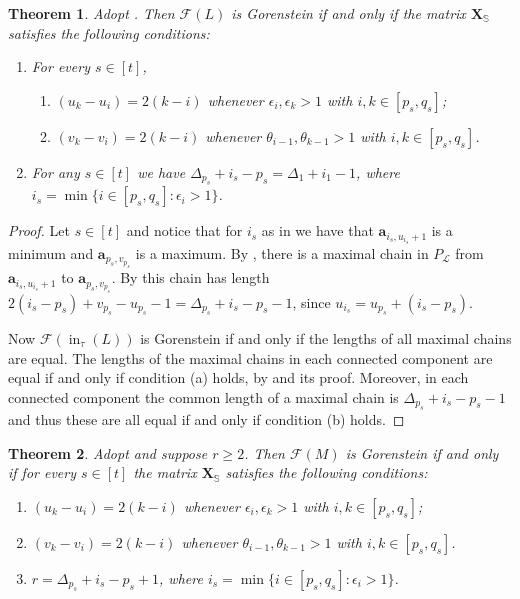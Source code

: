 \documentclass[11pt,a4paper,reqno,dvipsnames]{amsart}
\theoremstyle{plain}
\newtheorem{Theorem}{Theorem}[section]
\theoremstyle{definition}
\newtheorem{Assumptions and Discussion}[Theorem]{Assumptions and Discussion}
\theoremstyle{remark}
\def\ini{\operatorname{in}}
\newcommand\bda{{\bm a}}
\newcommand\bfX{\mathbf{X}}
\newcommand\bfS{\mathbb{S}}
\newcommand\calF{\mathcal{F}}
\newcommand\calL{\mathcal{L}}
\begin{document}
\begin{Theorem}\label{thm: GorL}
       Adopt . Then 
    $\calF(L)$ is Gorenstein if and only if the matrix $\bfX_{\bfS}$ satisfies the following conditions: 
    \begin{enumerate}[a]
    \item For every $s\in [t]$,
    \begin{enumerate} [i]
    \item $(u_k-u_i) = 2(k-i)$ whenever $\epsilon_i, \epsilon_k>1$ with $i, k\in [p_s, q_s]$;
    \item $(v_k-v_i) = 2(k-i)$  whenever  $\theta_{i-1}, \theta_{k-1} >1$ with $i, k\in [p_s, q_s]$.
    \end{enumerate}

   \item    For any $s\in [t]$ we have $\Delta_{p_s}+i_s-p_s=\Delta_1+i_1-1$, where $i_s=\min\{i\in [p_s,q_s]: \epsilon_i>1\}$.
\end{enumerate}
\end{Theorem}

\begin{proof}
Let $s\in [t]$ and notice that for $i_s$ as in  we have that $\bda_{i_s,u_{i_s}+1}$ is a minimum and $\bda_{p_s, v_{p_s}}$ is a maximum. By , there is a maximal chain in $P_{\calL}$ from $\bda_{i_s,u_{i_s}+1}$ to $\bda_{p_s,v_{p_s}}$. By  this chain has length $2(i_s-p_s)+v_{p_s}-u_{p_s}-1=\Delta_{p_s}+i_s-p_s-1$, since $u_{i_s}=u_{p_s}+(i_s-p_s)$.

Now $\calF(\ini_{\tau}(L))$ is Gorenstein if and only if the lengths of all maximal chains are equal. The lengths of the maximal chains in each connected component are equal if and only if condition (a) holds, by  and its proof. Moreover, in each connected component the common length of a maximal chain  is $\Delta_{p_s}+i_s-p_s-1$ and thus these are all equal if and only if condition (b) holds. 
\end{proof}


\begin{Theorem}\label{thm: GorM}
       Adopt  and suppose $r\ge 2$. Then 
    $\calF(M)$ is Gorenstein if and only if for every $s\in [t]$ the matrix $\bfX_{\bfS}$ satisfies the following conditions: 
    \begin{enumerate}[a]
\item 
 $(u_k-u_i) = 2(k-i)$ whenever $\epsilon_i, \epsilon_k>1$ with $i, k\in [p_s, q_s]$;
\item 
$(v_k-v_i) = 2(k-i)$  whenever  $\theta_{i-1}, \theta_{k-1} >1$ with $i, k\in [p_s, q_s]$.
\item $r=\Delta_{p_s}+i_s
-p_s+1$, where $i_s=\min\{i\in [p_s,q_s]: \epsilon_i>1 \}$.
\end{enumerate}
\end{Theorem}
\end{document}
